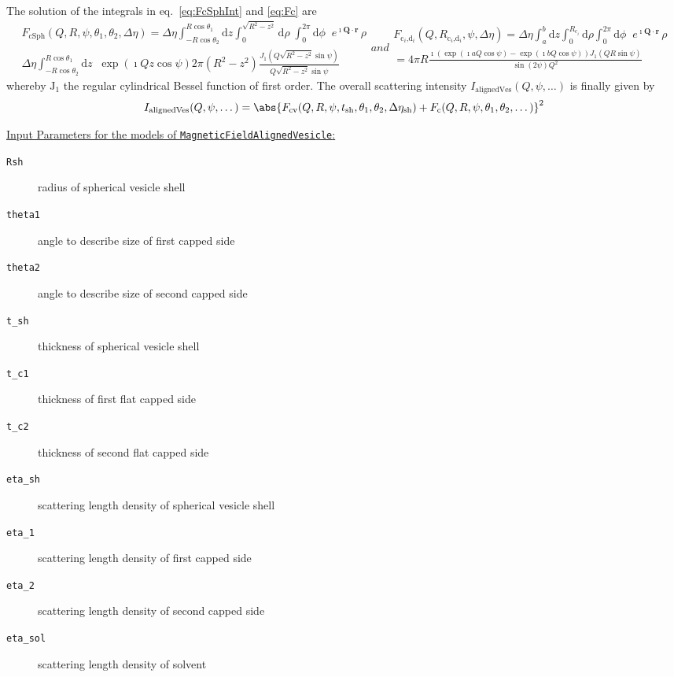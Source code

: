 The solution of the integrals in eq.\ \ref{eq:FcSphInt} and \ref{eq:Fc} are
\begin{subequations}
\begin{multline}
F_\text{cSph}(Q,R,\psi,\theta_1,\theta_2,\Delta\eta) = \Delta\eta \!\!
\int_{-R\cos\theta_2}^{R\cos\theta_1} \!\!\!\!\! \mathrm{d}z \!\!\!
\int_0^{\sqrt{R^2-z^2}}\!\!\!\!\! \mathrm{d}\rho \;
\int_0^{2\pi} \mathrm{d}\phi \;\; e^{\imath \mathbf{Q}\cdot\mathbf{r}}
\, \rho  \\
 \Delta\eta \!\!
\int_{-R\cos\theta_2}^{R\cos\theta_1} \!\!\!\!\! \mathrm{d}z\;\;
\exp\left(\imath Q z \cos\psi\right)  2\pi \left(R^2 - z^2\right)
\frac{J_1\left(Q \sqrt{R^2 - z^2} \sin\psi\right)}{Q \sqrt{R^2 - z^2} \sin\psi}
\label{eq:FcSphPsi}
\end{multline}
and
\begin{multline}
F_\textrm{c$_i$,d$_i$}(Q,R_\textrm{c$_i$,d$_i$},\psi,\Delta\eta)   =
\Delta\eta \int_{a}^{b}\!\! \mathrm{d}z
           \int_0^{R_\textrm{c$_i$}}\!\! \mathrm{d}\rho
           \int_0^{2\pi}\!\! \mathrm{d}\phi \;\; e^{\imath \mathbf{Q}\cdot\mathbf{r}}
\, \rho \\
 = 4 \pi R \frac{\imath \left(\exp\left(\imath a Q \cos\psi\right)-\exp\left(\imath b Q \cos\psi\right)\right)
 J_1\left(Q R \sin\psi\right)}{\sin\left(2\psi\right) Q^2}
\end{multline}
\end{subequations}
whereby $\mathrm{J}_1$ the regular cylindrical Bessel function of first order.
The overall scattering intensity $I_{\textrm{alignedVes}}(Q,\psi,\dots)$ is finally given by
\begin{align}
I_{\textrm{alignedVes}}(Q,\psi,\dots) =
\abs{
 F_\text{cv}(Q,R,\psi,t_\text{sh},\theta_1,\theta_2,\Delta\eta_\text{sh})
+F_\text{c}(Q,R,\psi,\theta_1,\theta_2,\dots)}^2
\end{align}
\vspace{5mm}
\begin{sloppypar}
\noindent \underline{Input Parameters for the models of \texttt{MagneticFieldAlignedVesicle}:}
\end{sloppypar}
\begin{description}
\item[\texttt{Rsh}] radius of spherical vesicle shell
\item[\texttt{theta1}] angle to describe size of first capped side
\item[\texttt{theta2}] angle to describe size of second capped side
\item[\texttt{t\_sh}] thickness of spherical vesicle shell
\item[\texttt{t\_c1}] thickness of first flat capped side
\item[\texttt{t\_c2}] thickness of second flat capped side
\item[\texttt{eta\_sh}] scattering length density of spherical vesicle shell
\item[\texttt{eta\_1}] scattering length density of first capped side
\item[\texttt{eta\_2}] scattering length density of second capped side
\item[\texttt{eta\_sol}] scattering length density of solvent
\end{description}

